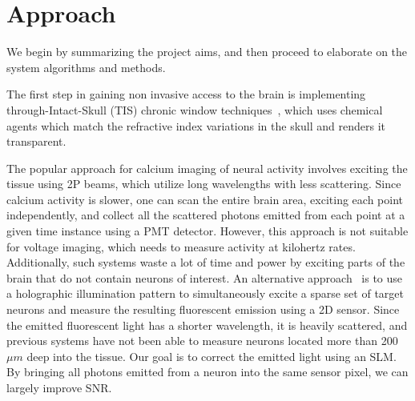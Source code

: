 \section{Approach}

We begin by summarizing the project aims, and then proceed to elaborate on the system algorithms and methods.

The first step in gaining non invasive access to the brain is 
implementing through-Intact-Skull (TIS) chronic window techniques~\cite{Li2022TIS}, which uses chemical agents which match the refractive index variations in the skull and renders it transparent. 

The popular approach for calcium imaging of neural activity involves exciting the tissue using 2P beams, which utilize long wavelengths with less scattering. Since calcium activity is slower, one can scan the entire brain area, exciting each point independently, and collect all the scattered photons emitted from each point at a given time instance using a PMT detector. However, this approach is not suitable for voltage imaging, which needs to measure activity at kilohertz rates. Additionally, such systems waste a lot of time and power by exciting parts of the brain that do not contain neurons of interest.
An alternative approach~\cite{Sims2024Scanless} is to use a holographic illumination pattern to simultaneously excite a sparse set of target neurons and measure the resulting fluorescent emission using a 2D sensor. Since the emitted fluorescent light has a shorter wavelength, it is heavily scattered, and previous systems have not been able to measure neurons located more than 200$\mu m$ deep into the tissue. Our goal is to correct the emitted light using an SLM. By bringing all photons emitted from a neuron into the same sensor pixel, we can largely improve SNR.


